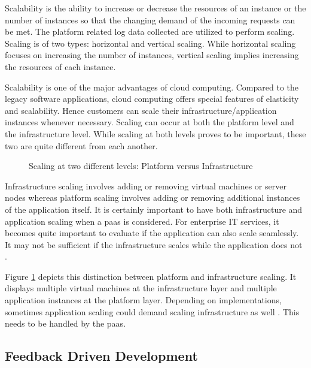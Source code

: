 \documentclass[article,type=msc,colorback,12pt,accentcolor=tud8b,table]{tudthesis}
\begin{document}
		Scalability is the ability to increase or decrease the resources of an instance or the number of instances so that the changing demand of the incoming requests can be met. The platform related log data collected are utilized to perform scaling. Scaling is of two types: horizontal and vertical scaling. While horizontal scaling focuses on increasing the number of instances, vertical scaling implies increasing the resources of each instance.
		
		Scalability is one of the major advantages of cloud computing. Compared to the legacy software applications, cloud computing offers special features of elasticity and scalability. Hence customers can scale their infrastructure/application instances whenever necessary. Scaling can occur at both the platform level and the infrastructure level. While scaling at both levels proves to be important, these two are quite different from each another. 
		
		\begin{figure}[!h]
			\begin{center}
			\end{center}
			\caption{Scaling at two different levels: Platform versus Infrastructure}
			\label{fig:scaling_infra_platform}
		\end{figure}
		
		Infrastructure scaling involves adding or removing virtual machines or server nodes whereas platform scaling involves adding or removing additional instances of the application itself. It is certainly important to have both infrastructure and application scaling when a \gls{paas} is considered. For enterprise IT services, it becomes quite important to evaluate if the application can also scale seamlessly. It may not be sufficient if the infrastructure scales while the application does not \cite{app_infra_scale}. 
		
		Figure \ref{fig:scaling_infra_platform} depicts this distinction between platform and infrastructure scaling. It displays multiple virtual machines at the infrastructure layer and multiple application instances at the platform layer. Depending on implementations, sometimes application scaling could demand scaling infrastructure as well \cite{cf_scale}. This needs to be handled by the \gls{paas}. 
		
		\subsection{Feedback Driven Development } 		
		
\end{document}
